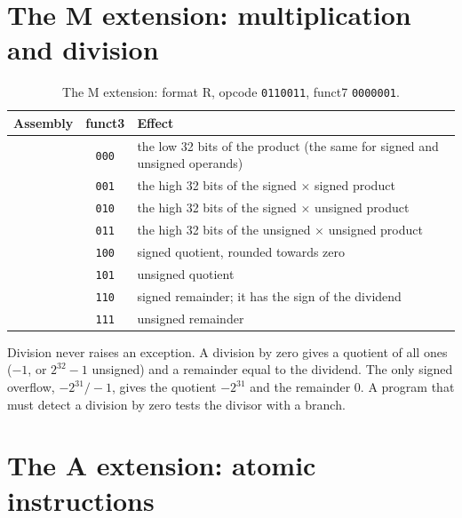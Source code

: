 \section{The M extension: multiplication and division}

\begin{table}[htb]
\centering\small
\caption{The M extension: format R, opcode \texttt{0110011}, funct7
\texttt{0000001}.}\label{tab:rv:m}
\begin{tabularx}{\textwidth}{@{}lcL@{}}
\toprule
\textbf{Assembly} & \textbf{funct3} & \textbf{Effect}\\
\midrule
{} & \texttt{000} & the low 32 bits of the product (the same for signed and unsigned operands)\\
 & \texttt{001} & the high 32 bits of the signed $\times$ signed product\\
 & \texttt{010} & the high 32 bits of the signed $\times$ unsigned product\\
 & \texttt{011} & the high 32 bits of the unsigned $\times$ unsigned product\\
 & \texttt{100} & signed quotient, rounded towards zero\\
 & \texttt{101} & unsigned quotient\\
 & \texttt{110} & signed remainder; it has the sign of the dividend\\
 & \texttt{111} & unsigned remainder\\
\bottomrule
\end{tabularx}
\end{table}

Division never raises an exception. A division by zero gives a quotient of
all ones ($-1$, or $2^{32}-1$ unsigned) and a remainder equal to the dividend.
The only signed overflow, $-2^{31}/-1$, gives the quotient $-2^{31}$ and the
remainder 0. A program that must detect a division by zero tests the divisor
with a branch.

\section{The A extension: atomic instructions}

